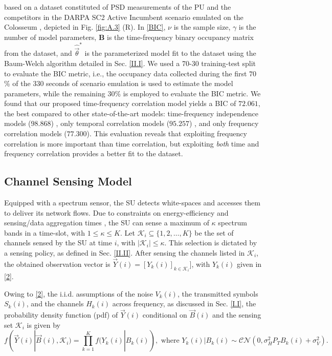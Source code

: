 \documentclass[12pt, draftcls, onecolumn]{IEEEtran}
\begin{document}
based on a dataset constituted of PSD measurements of the PU and the competitors in the DARPA SC2 Active Incumbent scenario emulated on the Colosseum \cite{DARPA:SC2, DARPA:SC2c2api, DARPA:ActiveIncumbent, DARPA:SC2scenarios}, depicted in Fig. \ref{fig:A.3} (R). In \eqref{BIC}, $\nu$ is the sample size, $\gamma$ is the number of model parameters, $\mathbf{B}$ is the time-frequency binary occupancy matrix from the dataset, and $\hat{\vec{\theta}}^*$ is the parameterized model fit to the dataset using the Baum-Welch algorithm detailed in Sec. \ref{II.I}. We used a 70-30 training-test split to evaluate the BIC metric, i.e., the occupancy data collected during the first $70$\% of the $330$ seconds of scenario emulation is used to estimate the model parameters, while the remaining $30$\% is employed to evaluate the BIC metric. We found that our proposed time-frequency correlation model yields a BIC of $72.061$, the best compared to other state-of-the-art models: time-frequency independence models ($98.868$) \cite{WCL:4, WCL:10, WCL:9, WCL:11, WCL:8}, only temporal correlation models ($95.257$) \cite{WCL:5}, and only frequency correlation models ($77.300$). This evaluation reveals that exploiting frequency correlation is more important than time correlation, but exploiting \emph{both} time and frequency correlation provides a better fit to the dataset.

\subsection{Channel Sensing Model}\label{I.III}
Equipped with a spectrum sensor, the SU detects white-spaces and accesses them to deliver its network flows. Due to constraints on energy-efficiency and sensing/data aggregation times \cite{WCL:3}, the SU can sense a maximum of $\kappa$ spectrum bands in a time-slot, with $1{\leq}\kappa{\leq}K$. Let $\mathcal{K}_{i}{\subseteq}\{1,2,\dots,K\}$ be the set of channels sensed by the SU at time $i$, with $|\mathcal{K}_{i}|{\leq}\kappa$. This selection is dictated by a sensing policy, as defined in Sec. \ref{II.II}. After sensing the channels listed in $\mathcal{K}_{i}$, the obtained observation vector is $\vec{Y}(i){=}[Y_{k}(i)]_{k{\in}\mathcal{K}_{i}}]$, with  $Y_{k}(i)$ given in \eqref{2}.

Owing to \eqref{2}, the  i.i.d. assumptions of the noise $V_{k}(i)$, the transmitted symbols $S_{k}(i)$, and the channels $H_{k}(i)$ across frequency, as discussed in Sec. \ref{I.I}, the probability density function (pdf) of $\vec{Y}(i)$ conditional on $\vec{B}(i)$ and the sensing set $\mathcal{K}_{i}$ is given by
\begin{equation}\label{8}
    f(\vec{Y}(i)|\vec{B}(i),\mathcal{K}_{i})=\prod_{k=1}^{K}f(Y_{k}(i)|B_{k}(i)),\text{ where }
        Y_{k}(i)|B_{k}(i)\sim\mathcal{CN}(0,\sigma_{H}^{2}P_{T}B_{k}(i)+\sigma_{V}^{2}).
\end{equation}
\end{document}
